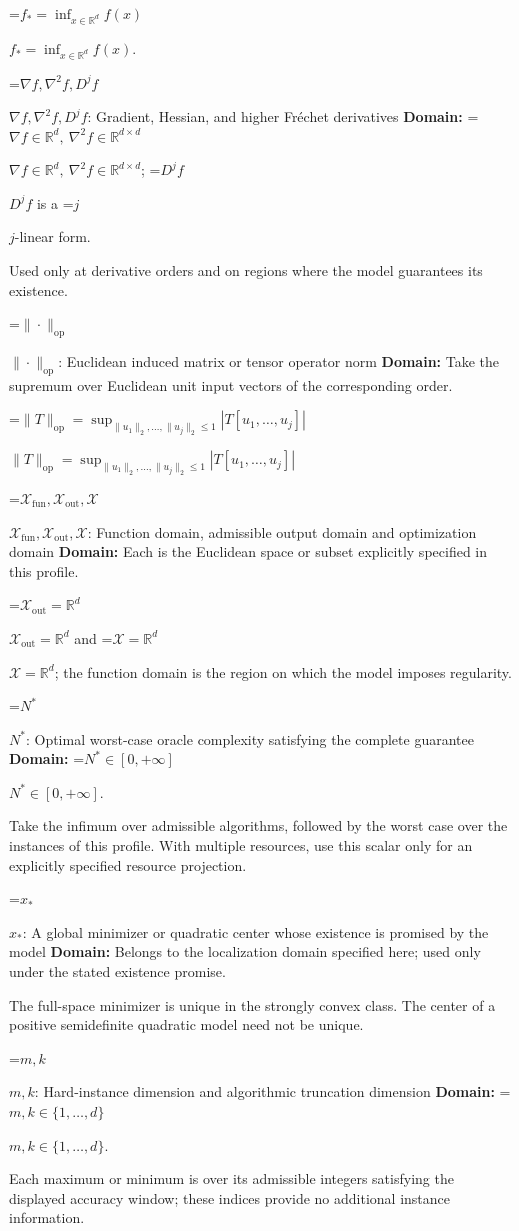 \documentclass[10pt,a4paper]{article}
\newcommand{\AtlasMath}[1]{\par\begingroup\centering\setbox0=\hbox{$\displaystyle #1$}\ifdim\wd0>1.4\linewidth\typeout{ATLAS WIDE FORMULA: \the\wd0}\fi\ifdim\wd0>\linewidth\resizebox{\linewidth}{!}{\box0}\else\box0\fi\par\endgroup}
\newcommand{\AtlasInlineMath}[1]{\begingroup\setbox0=\hbox{$#1$}\ifdim\wd0>.4\linewidth\endgroup\AtlasMath{#1}\else\endgroup$#1$\fi}
\begin{document}
\AtlasInlineMath{f_*=\inf_{x\in \mathbb{R}^d}f(x)}.

\AtlasInlineMath{\nabla f,\nabla^2f,D^jf}: Gradient, Hessian, and higher Fréchet derivatives \textbf{Domain:} \AtlasInlineMath{\nabla f\in\mathbb{R}^d,\ \nabla^2f\in\mathbb{R}^{d\times d}}; \AtlasInlineMath{D^jf} is a \AtlasInlineMath{j}-linear form.

Used only at derivative orders and on regions where the model guarantees its existence.

\AtlasInlineMath{\|\cdot\|_{\mathrm{op}}}: Euclidean induced matrix or tensor operator norm \textbf{Domain:} Take the supremum over Euclidean unit input vectors of the corresponding order.

\AtlasInlineMath{\|T\|_{\mathrm{op}}=\sup_{\|u_1\|_2,\ldots,\|u_j\|_2\le1}|T[u_1,\ldots,u_j]|}

\AtlasInlineMath{\mathcal{X}_{\mathrm{fun}},\mathcal{X}_{\mathrm{out}},\mathcal{X}}: Function domain, admissible output domain and optimization domain \textbf{Domain:} Each is the Euclidean space or subset explicitly specified in this profile.

\AtlasInlineMath{\mathcal{X}_{\mathrm{out}}=\mathbb{R}^d} and \AtlasInlineMath{\mathcal{X}=\mathbb{R}^d}; the function domain is the region on which the model imposes regularity.

\AtlasInlineMath{N^*}: Optimal worst-case oracle complexity satisfying the complete guarantee \textbf{Domain:} \AtlasInlineMath{N^*\in[0,+\infty]}.

Take the infimum over admissible algorithms, followed by the worst case over the instances of this profile. With multiple resources, use this scalar only for an explicitly specified resource projection.

\AtlasInlineMath{x_*}: A global minimizer or quadratic center whose existence is promised by the model \textbf{Domain:} Belongs to the localization domain specified here; used only under the stated existence promise.

The full-space minimizer is unique in the strongly convex class. The center of a positive semidefinite quadratic model need not be unique.

\AtlasInlineMath{m,k}: Hard-instance dimension and algorithmic truncation dimension \textbf{Domain:} \AtlasInlineMath{m,k\in\{1,\ldots,d\}}.

Each maximum or minimum is over its admissible integers satisfying the displayed accuracy window; these indices provide no additional instance information.
\end{document}

